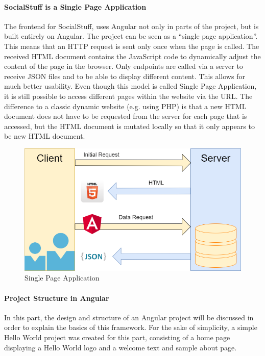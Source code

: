 \paragraph{SocialStuff is a Single Page Application}
The frontend for SocialStuff, uses Angular not only in parts of the project, but is built entirely on Angular.
The project can be seen as a \enquote{single page application}.
This means that an HTTP request is sent only once when the page is called.
The received HTML document contains the JavaScript code to dynamically adjust the content of the page in the browser.
Only endpoints are called via a server to receive JSON files and to be able to display different content.
This allows for much better usability.
Even though this model is called Single Page Application, it is still possible to access different pages within the
website via the URL. The difference to a classic dynamic website (e.g. using PHP) is that a new HTML document does not
have to be requested from the server for each page that is accessed, but the HTML document is mutated locally so that
it only appears to be new HTML document.

\begin{figure}[H]
    \centering
    \includegraphics[width=1.0\textwidth]{./images/single_page_app}
    \caption{Single Page Application}
    \label{fig:singpageapp}
\end{figure}

\newpage
\paragraph{Project Structure in Angular}
In this part, the design and structure of an Angular project will be discussed in order to explain the basics of this
framework.
For the sake of simplicity, a simple Hello World project was created for this part, consisting of a home page displaying
a Hello World logo and a welcome text and sample about page.

